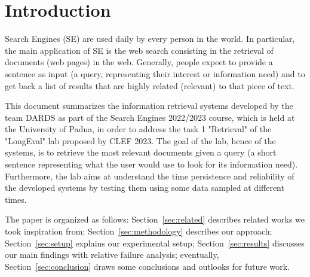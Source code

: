 \section{Introduction}
\label{sec:introduction}
%
%

Search Engines (SE) are used daily by every person in the world. In particular, the main application of SE is the web search consisting in the retrieval of documents (web pages) in the web. Generally, people expect to provide a sentence as input (a query, representing their interest or information need) and to get back a list of results that are highly related (relevant) to that piece of text.
\par
This document summarizes the information retrieval systems developed by the team DARDS as part of the Search Engines 2022/2023 course, which is held at the University of Padua, in order to address the task 1 "Retrieval" of the "LongEval" lab proposed by CLEF 2023. The goal of the lab, hence of the systems, is to retrieve the most relevant documents given a query (a short sentence representing what the user would use to look for its information need). Furthermore, the lab aims at understand the time persistence and reliability of the developed systems by testing them using some data sampled at different times.

\par
The paper is organized as follows: Section~\ref{sec:related} describes related works we took inspiration from; Section~\ref{sec:methodology} describes our approach; Section~\ref{sec:setup} explains our experimental setup; Section~\ref{sec:results} discusses our main findings with relative failure analysis; eventually, Section~\ref{sec:conclusion} draws some conclusions and outlooks for future work.